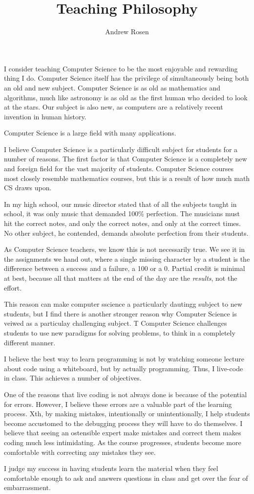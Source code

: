 \documentclass[10pt, a4paper]{article}
\author{Andrew Rosen}
\title{Teaching Philosophy}
\date{}
\begin{document}
\maketitle
	
I consider teaching Computer Science to be the most enjoyable and rewarding thing I do.
Computer Science itself has the privilege of simultaneously being both an old and new subject.
Computer Science is as old as mathematics and algorithms, much like astronomy is as old as the first human who decided to look at the stars.
Our subject is also new, as computers are a relatively recent invention in human history.


Computer Science is a large field with many applications.




I believe Computer Science is a particularly difficult subject for students for a number of reasons.
The first factor is that Computer Science is a completely new and foreign field for the vast majority of students.
Computer Science courses most closely resemble mathematics courses, but this is a result of how much math CS draws upon.

In my high school, our music director stated that of all the subjects taught in school, it was only music that demanded 100\% perfection.
The musicians must hit the correct notes, and only the correct notes, and only at the correct times.
No other subject, he contended, demands absolute perfection from their students.

As Computer Science teachers, we know this is not necessarily true. 
We see it in the assignments we hand out, where a single missing character by a student is the difference between a success and a failure, a 100 or a 0.
Partial credit is minimal at best, because all that matters at the end of the day are the \textit{results}, not the effort.

This reason can make computer sscience a particularly dautingg subject to new students, but I find there is another stronger reason why Computer Science is veiwed as  a particulay  challenging subject.  
T
Computer Science challenges students to use new paradigms for solving problems, to think in a completely different manner.



I believe the best way to learn programming is not by watching someone lecture about code using a whiteboard, but by actually programming.
Thus, I live-code in class.
This achieves a number of objectives.

One of the reasons that live coding is not always done is because of the potential for errors.
However, I believe these errors are a valuable part of the learning process.
Xth, by making mistakes, intentionally or unintentionally, I help students become accustomed to the debugging process they will have to do themselves.
I believe that seeing an ostensible expert make mistakes and correct them makes coding much less intimidating.
As the course progresses, students become more comfortable with correcting any mistakes they see.




I judge my success in having students learn the material when they feel comfortable enough to ask and  answers questions in class and get over the fear of embarrassment.
\end{document}
